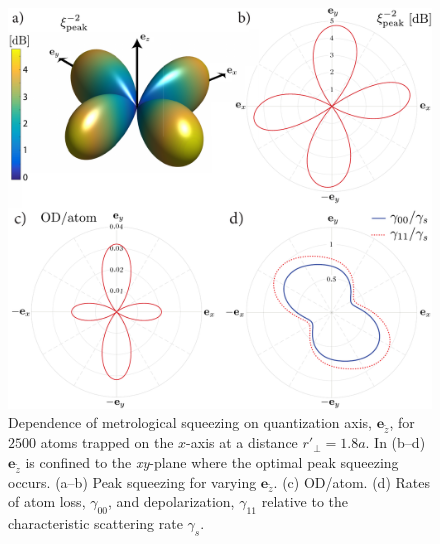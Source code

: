 \documentclass[preprint, aps,pra,onecolumn]{revtex4-1} %
\newcommand{\qaxis}{\mathbf{e}_{\tilde{z}}}
\begin{document}
\begin{figure}
\includegraphics[scale=0.37]{./Figs/Fig_SqueezingQuantAxis}
\caption{Dependence of metrological squeezing on quantization axis, $\qaxis$, for $2500$ atoms trapped on the $x$-axis at a distance $ r'\!_\perp=1.8a$. In (b--d) $\qaxis$ is confined to the \emph{xy}-plane where the optimal peak squeezing occurs.
(a--b) Peak squeezing for varying $\qaxis$. 
(c) OD/atom.
(d) Rates of atom loss, $\gamma_{00}$, and depolarization, $\gamma_{11}$ relative to the characteristic scattering rate $\gamma_s$. }\label{Fig::Squeezing_QuantizationAxis}
\end{figure}
\end{document}
